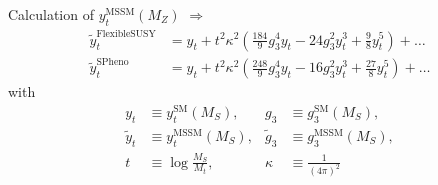 \documentclass[hyperref={pdfpagelabels=false},ngerman]{beamer}
\newcommand{\SM}{\ensuremath{\text{SM}}}
\begin{document}
\newcommand{\FS}{FlexibleSUSY\xspace}
\newcommand{\SARAH}{SARAH\xspace}
\newcommand{\Softsusy}{SOFTSUSY\xspace}
\newcommand{\SPheno}{SPheno\xspace}
\newcommand{\SUSYHD}{SUSYHD\xspace}

\newcommand{\bgsgs}{\beta_{\gshigh,\gshigh^2}}
\newcommand{\bytgs}{\beta_{\ythigh,\gshigh^2}}
\newcommand{\bytyt}{\beta_{\ythigh,\ythigh^2}}
\newcommand{\bvyt}{\beta_{\vhigh,\ythigh^2}}
\newcommand{\blambdaytyt}{\beta_{\lambdahigh,\ythigh^4}}
\newcommand{\blambdayt}{\beta_{\lambdahigh,\ythigh^2\lambdahigh}}
\newcommand{\blambdalambda}{\beta_{\lambdahigh,\lambdahigh^2}}
\newcommand{\btildegsgs}{\tilde\beta_{\gshigh,\gshigh^2}}
\newcommand{\btildeytgs}{\tilde\beta_{\ythigh,\gshigh^2}}
\newcommand{\btildeytyt}{\tilde\beta_{\ythigh,\ythigh^2}}
\newcommand{\btildevyt}{\tilde\beta_{\vhigh,\ythigh^2}}

\newcommand{\gs}{\hat{g}_3}
\newcommand{\gsMSSM}{\bar{g}_3}
\newcommand{\ytlow}{\hat{y}_t}
\newcommand{\ytMSSMlow}{\bar{y}_t}
\newcommand{\vlow}{\hat{v}}
\newcommand{\vMSSM}{\bar{v}}
\newcommand{\gshigh}{{g}_3}
\newcommand{\gsMSSMhigh}{\tilde{g}_3}
\newcommand{\ythigh}{y_t}
\newcommand{\ytMSSMhigh}{\tilde{y}_t}
\newcommand{\vhigh}{v}
\newcommand{\vMSSMhigh}{\tilde{v}}
\newcommand{\lambdalow}{\hat{\lambda}}
\newcommand{\lambdahigh}{{\lambda}}

\newcommand{\kappaL}{\kappa}

\begin{frame}{Calculation of $y_t^{\text{MSSM}}(M_Z)$}
  $\Rightarrow$
  \begin{align*}
    \ytMSSMhigh^{\text{\FS}} &= 
    \ythigh +
    t^2\kappaL^2 \left(\frac{184}{9} \gshigh^4 \ythigh -24 \gshigh^2
      \ythigh^3 
      +\frac{9}{8} \ythigh^5 \right) 
    +\ldots\\
    \ytMSSMhigh^{\text{\SPheno}} &= 
    \ythigh +
    t^2 \kappaL^2 \left(\frac{248}{9} \gshigh^4 \ythigh-16 \gshigh^2
      \ythigh^3
      +\frac{27}{8} \ythigh^5\right) 
    +\ldots
  \end{align*}
  with
  \begin{align*}
    y_t &\equiv y_t^\SM(M_S), & g_3 &\equiv g_3^\SM(M_S), \\
    \tilde{y}_t &\equiv y_t^\text{MSSM}(M_S), & \tilde{g}_3 &\equiv g_3^\text{MSSM}(M_S), \\
    t &\equiv \log\frac{M_S}{M_t}, & \kappaL &\equiv \frac{1}{(4 \pi)^2}
  \end{align*}
\end{frame}
\end{document}
